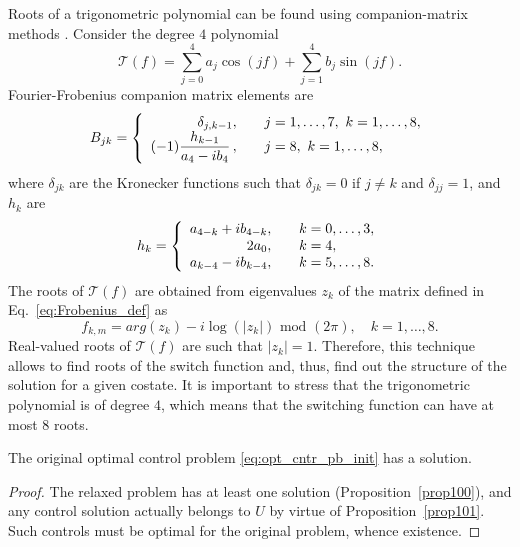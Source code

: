 \documentclass[AMA,STIX1COL]{WileyNJD-v2}
\begin{document}
\begin{remark} \label{rem1}
Roots of a trigonometric polynomial can be found using companion-matrix methods \cite{boyd_computing_2007}. Consider the degree $4$ polynomial
$$
\mathcal{T} (f) = \sum_{j=0}^4 a_j \cos(jf) + \sum_{j=1}^4 b_j \sin(jf).
$$
Fourier-Frobenius companion matrix elements are 
%
\begin{equation}
	\label{eq:Frobenius_def}
	B_{jk} =
	\left \{
	\begin{array}{r@{\quad \quad}l}
	\delta_{j, k-1}, & j=1,\ldots,7, \ k = 1, \ldots, 8, \\
	\displaystyle (-1)\frac{h_{k-1}}{a_4 - i b_4}\,, & j = 8, \ k = 1, \ldots, 8,
	\end{array}
	\right.	
\end{equation}
where $\delta_{jk}$ are the Kronecker functions such that $\delta_{jk} = 0$ if $j \neq k$ and $\delta_{jj} = 1$, and $h_k$ are 
%
\begin{equation}
	h_k = 
	\left \{
		\begin{array}{r@{\quad \quad}l}
			a_{4-k} + i b_{4-k}, & k = 0,\ldots,3, \\
			2 a_0, & k = 4, \\
			a_{k-4} - i b_{k-4}, & k = 5, \ldots,8.
	\end{array}
	\right.	
\end{equation}
%
The roots of $\mathcal{T}(f)$ are obtained from eigenvalues $z_k$ of the matrix defined in Eq.~\eqref{eq:Frobenius_def}
as
$$ f_{k,m} = arg(z_k) - i \log(|z_k|) \text{ mod } (2\pi), \quad k= 1,\ldots,8. $$
Real-valued roots of $\mathcal{T}(f)$ are such that $|z_k|=1$. Therefore, this technique allows to find roots
of the switch function and, thus, find out the structure of the solution for a given costate.
It is important to stress that the trigonometric polynomial is of degree $4$,
which means that the switching function can have at most $8$ roots.
\end{remark}

\begin{corollary} \label{cor110}
The original optimal control problem \eqref{eq:opt_cntr_pb_init} has a solution.
\end{corollary}

\begin{proof} The relaxed problem has at least one solution (Proposition~\ref{prop100}),
and any control solution actually belongs to $U$ by virtue of Proposition~\ref{prop101}. Such controls
must be optimal for the original problem, whence existence.
\end{proof}
\end{document}
